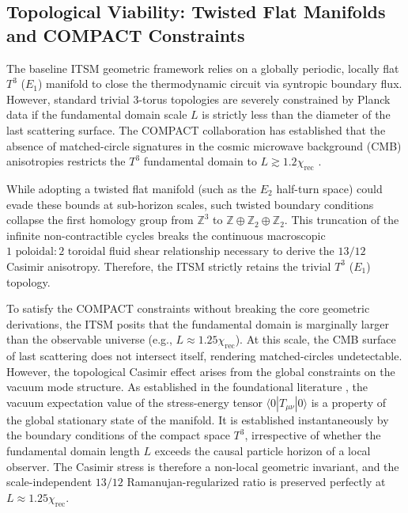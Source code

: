 \documentclass[aps,prd,10pt,twocolumn,superscriptaddress,nofootinbib,floatfix]{revtex4-2}
\begin{document}
\subsection{Topological Viability: Twisted Flat Manifolds and COMPACT Constraints}

The baseline ITSM geometric framework relies on a globally periodic, locally flat $T^{3}$ ($E_1$) manifold to close the thermodynamic circuit via syntropic boundary flux. However, standard trivial 3-torus topologies are severely constrained by Planck data if the fundamental domain scale $L$ is strictly less than the diameter of the last scattering surface. The COMPACT collaboration has established that the absence of matched-circle signatures in the cosmic microwave background (CMB) anisotropies restricts the $T^3$ fundamental domain to $L \gtrsim 1.2 \chi_{\text{rec}}$ \cite{compact_promise, compact_part4a}.

While adopting a twisted flat manifold (such as the $E_2$ half-turn space) could evade these bounds at sub-horizon scales, such twisted boundary conditions collapse the first homology group from $\mathbb{Z}^3$ to $\mathbb{Z} \oplus \mathbb{Z}_2 \oplus \mathbb{Z}_2$. This truncation of the infinite non-contractible cycles breaks the continuous macroscopic $1\text{ poloidal}: 2\text{ toroidal}$ fluid shear relationship necessary to derive the $13/12$ Casimir anisotropy. Therefore, the ITSM strictly retains the trivial $T^3$ ($E_1$) topology.

To satisfy the COMPACT constraints without breaking the core geometric derivations, the ITSM posits that the fundamental domain is marginally larger than the observable universe (e.g., $L \approx 1.25 \chi_{\text{rec}}$). At this scale, the CMB surface of last scattering does not intersect itself, rendering matched-circles undetectable. However, the topological Casimir effect arises from the global constraints on the vacuum mode structure. As established in the foundational literature \cite{birrell_davies_1982, lachieze_luminet_1995}, the vacuum expectation value of the stress-energy tensor $\langle 0 | T_{\mu\nu} | 0 \rangle$ is a property of the global stationary state of the manifold. It is established instantaneously by the boundary conditions of the compact space $T^3$, irrespective of whether the fundamental domain length $L$ exceeds the causal particle horizon of a local observer. The Casimir stress is therefore a non-local geometric invariant, and the scale-independent $13/12$ Ramanujan-regularized ratio is preserved perfectly at $L \approx 1.25 \chi_{\text{rec}}$.
\end{document}
